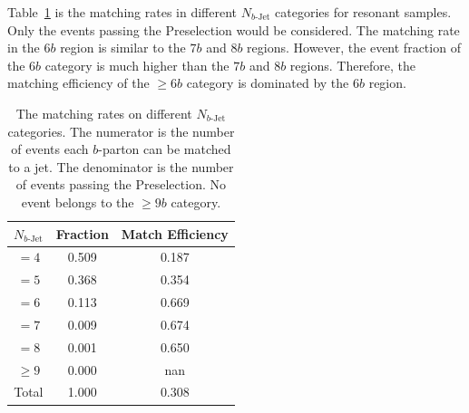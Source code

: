 \documentclass[12pt]{article}
\begin{document}
    Table~\ref{tab:resonant_match_rate_nbj_9b} is the matching rates in different $N_{b\text{-Jet}}$ categories for resonant samples. Only the events passing the Preselection would be considered. The matching rate in the $6b$ region is similar to the $7b$ and $8b$ regions. However, the event fraction of the $6b$ category is much higher than the $7b$ and $8b$ regions. Therefore, the matching efficiency of the $\ge 6b$ category is dominated by the $6b$ region.
    \begin{table}[htpb]
        \centering
        \caption{The matching rates on different $N_{b\text{-Jet}}$ categories. The numerator is the number of events each $b$-parton can be matched to a jet. The denominator is the number of events passing the Preselection. No event belongs to the $\ge 9b$ category.}
        \label{tab:resonant_match_rate_nbj_9b}
        \begin{tabular}{c|c|c}
        $N_{b\text{-Jet}}$    & Fraction  & Match Efficiency     \\ \hline
        $=4$                  & 0.509 & 0.187 \\
        $=5$                  & 0.368 & 0.354 \\
        $=6$                  & 0.113 & 0.669 \\
        $=7$                  & 0.009 & 0.674 \\
        $=8$                  & 0.001 & 0.650 \\
        $\ge 9$               & 0.000 & nan   \\ \hline
        Total                 & 1.000 & 0.308
        \end{tabular}
    \end{table}
\end{document}
